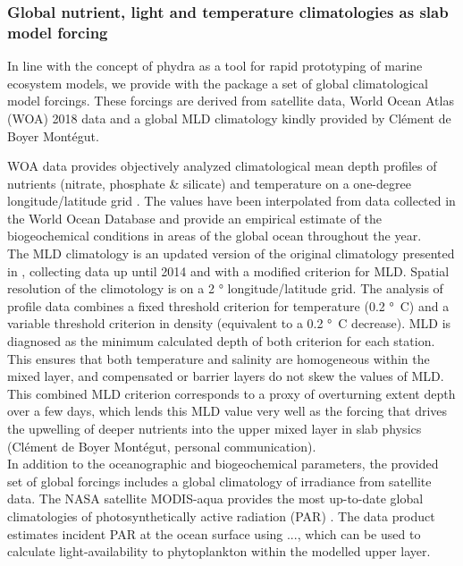 \documentclass[journal abbreviation, manuscript]{copernicus}
\begin{document}
\subsubsection{Global nutrient, light and temperature climatologies as slab model forcing}
In line with the concept of phydra as a tool for rapid prototyping of marine ecosystem models, we provide with the package a set of global climatological model forcings. These forcings are derived from satellite data, World Ocean Atlas (WOA) 2018 data and a global MLD climatology kindly provided by Clément de Boyer Montégut.

WOA data provides objectively analyzed climatological mean depth profiles of nutrients (nitrate, phosphate \& silicate) and temperature on a one-degree longitude/latitude grid \cite{Garcia2019WORLDSilicate}. The values have been interpolated from data collected in the World Ocean Database and provide an empirical estimate of the biogeochemical conditions in areas of the global ocean throughout the year.\\

The MLD climatology is an updated version of the original climatology presented in  \citet{deBoyerMontegut2004MixedClimatology}, collecting data up until 2014 and with a modified criterion for MLD. Spatial resolution of the climotology is on a 2 \unit{°} longitude/latitude grid. The analysis of profile data combines a fixed threshold criterion for temperature (0.2 \unit{°C}) and a variable threshold criterion in density (equivalent to a 0.2 \unit{°C} decrease). MLD is diagnosed as the minimum calculated depth of both criterion for each station. This ensures that both temperature and salinity are homogeneous within the mixed layer, and compensated or barrier layers do not skew the values of MLD. This combined MLD criterion corresponds to a proxy of overturning extent depth over a few days, which lends this MLD value very well as the forcing that drives the upwelling of deeper nutrients into the upper mixed layer in slab physics (Clément de Boyer Montégut, personal communication).\\

In addition to the oceanographic and biogeochemical parameters, the provided set of global forcings includes a global climatology of irradiance from satellite data. The NASA satellite MODIS-aqua provides the most up-to-date global climatologies of photosynthetically active radiation (PAR) \cite{MODIS-Aqua2018NASAGroup}. The data product estimates incident PAR at the ocean surface using ..., which can be used to calculate light-availability to phytoplankton within the modelled upper layer.\\
\end{document}
